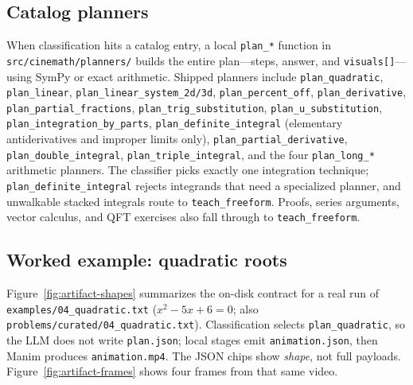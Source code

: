 \documentclass[11pt]{article}
\begin{document}
\subsection{Catalog planners}
\label{sec:catalog}

When classification hits a catalog entry, a local \texttt{plan\_*} function in
\texttt{src/cinemath/planners/} builds the entire plan---steps, answer, and
\texttt{visuals[]}---using SymPy or exact arithmetic. Shipped planners include
\texttt{plan\_quadratic}, \texttt{plan\_linear}, \texttt{plan\_linear\_system\_2d/3d},
\texttt{plan\_percent\_off}, \texttt{plan\_derivative},
\texttt{plan\_partial\_fractions}, \texttt{plan\_trig\_substitution},
\texttt{plan\_u\_substitution}, \texttt{plan\_integration\_by\_parts},
\texttt{plan\_definite\_integral} (elementary antiderivatives and improper
limits only), \texttt{plan\_partial\_derivative},
\texttt{plan\_double\_integral}, \texttt{plan\_triple\_integral}, and the four
\texttt{plan\_long\_*} arithmetic planners. The classifier picks exactly one
integration technique; \texttt{plan\_definite\_integral} rejects integrands
that need a specialized planner, and unwalkable stacked integrals route to
\texttt{teach\_freeform}. Proofs, series arguments, vector calculus, and QFT
exercises also fall through to \texttt{teach\_freeform}.

\subsection{Worked example: quadratic roots}
\label{sec:worked}

Figure~\ref{fig:artifact-shapes} summarizes the on-disk contract for a real run of
\texttt{examples/04\_quadratic.txt} ($x^{2}-5x+6=0$; also
\texttt{problems/curated/04\_quadratic.txt}).
Classification selects \texttt{plan\_quadratic}, so the LLM does not write
\texttt{plan.json}; local stages emit \texttt{animation.json}, then Manim
produces \texttt{animation.mp4}. The JSON chips show \emph{shape}, not full
payloads. Figure~\ref{fig:artifact-frames} shows four frames from that same
video.
\end{document}
